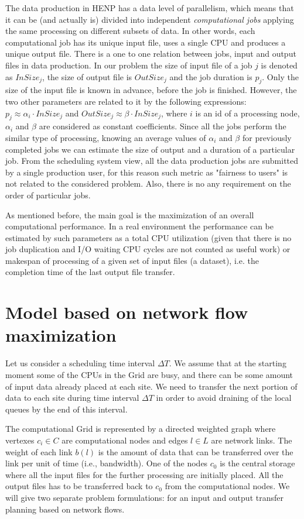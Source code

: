 \documentclass{svjour3}                     %
\begin{document}
The data production in HENP has a data level of parallelism, which means that it can be (and actually is) divided into independent \textit{computational jobs} applying the same processing on different subsets of data. In other words, each computational job has its unique input file, uses a single CPU and produces a unique output file. There is a one to one relation between jobs, input and output files in data production. In our problem the size of input file of a job $j$ is denoted as $InSize_{j}$, the size of output file is $OutSize_{j}$ and the job duration is $p_{j}$. Only the size of the input file is known in advance, before the job is finished. However, the two other parameters are related to it by the following expressions: $p_{j} \approx \alpha_{i} \cdot InSize_{j}$ and $OutSize_{j} \approx \beta\cdot InSize_{j}$, where $i$ is an id of a processing node, $\alpha_{i}$ and $\beta$ are considered as constant coefficients. Since all the jobs perform the similar type of processing, knowing an average values of $\alpha_{i}$ and $\beta$ for previously completed jobs we can estimate the size of output and a duration of a particular job. From the scheduling system view, all the data production jobs are submitted by a single production user, for this reason such metric as "fairness to users" is not related to the considered problem. Also, there is no any requirement on the order of particular jobs. 


As mentioned before, the main goal is the maximization of an overall computational performance. In a real environment the performance can be estimated by such parameters as a total CPU utilization (given that there is no job duplication and I/O waiting CPU cycles are not counted as useful work) or makespan of processing of a given set of input files (a dataset), i.e. the completion time of the last output file transfer.

\section{Model based on network flow maximization}
\label{modeling}
Let us consider a scheduling time interval $\Delta T$. We assume that at the
starting moment some of the CPUs in the Grid are busy, and there can be some amount of
input data already placed at each site. We need to transfer the next portion
of data to each site during time interval $\Delta T$ in order to avoid
draining of the local queues by the end of this interval. 

The computational Grid is represented by a directed weighted graph where
vertexes $c_{i} \in C$ are computational nodes and edges $l \in L$ are
network links. The weight of each link $b(l)$ is the amount of data that can be
transferred over the link per unit of time (i.e., bandwidth). One of the nodes
$c_{0}$ is the central storage where all the input files for the further
processing are initially placed. All the output files has to be transferred
back to $c_{0}$ from the computational nodes. We will give two separate
problem formulations: for an input and output transfer planning based on network flows. 
\end{document}
